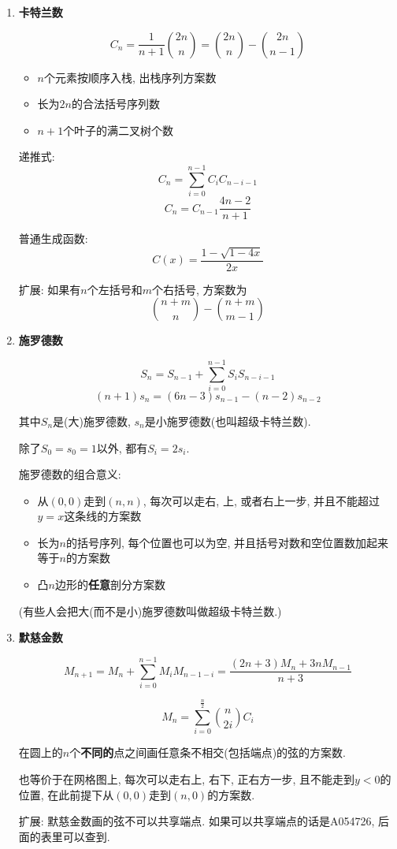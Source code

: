 \begin{enumerate}

\item \textbf{卡特兰数}

$$C_n = \frac 1 {n + 1}{2n\choose n} = {2n \choose n} - {2n \choose n - 1}$$

\begin{itemize}
	\item $n$个元素按顺序入栈, 出栈序列方案数
	\item 长为$2n$的合法括号序列数
	\item $n + 1$个叶子的满二叉树个数
\end{itemize}

递推式: 
$$C_n = \sum_{i = 0} ^ {n - 1} C_i C_{n - i - 1}$$
$$C_n = C_{n - 1} \frac {4n - 2} {n + 1}$$

普通生成函数:
$$C(x) = \frac {1 - \sqrt {1 - 4 x}} {2 x}$$

扩展: 如果有$n$个左括号和$m$个右括号, 方案数为
$${n + m \choose n} - {n + m \choose m - 1}$$

\item \textbf{施罗德数}

$$ S_n = S_{n-1} + \sum_{i = 0} ^ {n - 1} S_i S_{n - i - 1} $$
$$ (n + 1)s_n = (6n - 3)s_{n - 1} - (n - 2) s_{n - 2} $$

其中$S_n$是(大)施罗德数, $s_n$是小施罗德数(也叫超级卡特兰数).

除了$S_0 = s_0 = 1$以外, 都有$S_i = 2s_i$.

施罗德数的组合意义:
\begin{itemize}
	\item 从$(0, 0)$走到$(n, n)$, 每次可以走右, 上, 或者右上一步, 并且不能超过$y=x$这条线的方案数
	\item 长为$n$的括号序列, 每个位置也可以为空, 并且括号对数和空位置数加起来等于$n$的方案数
	\item 凸$n$边形的\textbf{任意}剖分方案数
\end{itemize}

(有些人会把大(而不是小)施罗德数叫做超级卡特兰数.)

\item \textbf{默慈金数}

$$ M_{n + 1} = M_n + \sum_{i = 0} ^ {n - 1} M_i M_{n - 1 - i} = \frac {(2n + 3)M_n + 3n M_{n - 1}} {n + 3} $$

$$ M_n = \sum_{i = 0} ^ {\frac n 2} {n \choose 2i} C_i $$

在圆上的$n$个\textbf{不同的}点之间画任意条不相交(包括端点)的弦的方案数.

也等价于在网格图上, 每次可以走右上, 右下, 正右方一步, 且不能走到$y<0$的位置, 在此前提下从$(0, 0)$走到$(n, 0)$的方案数.

扩展: 默慈金数画的弦不可以共享端点. 如果可以共享端点的话是A054726, 后面的表里可以查到.

\end{enumerate}